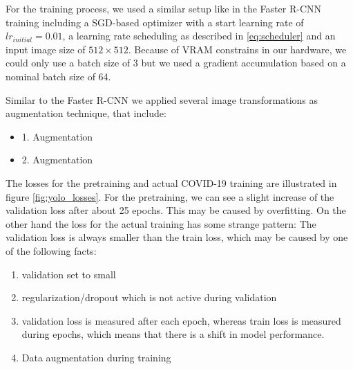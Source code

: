 For the training process, we used a similar setup like in the Faster \ac{R-CNN} training including a \ac{SGD}-based optimizer with a start learning rate of $lr_{initial} = 0.01$, a learning rate scheduling as described in \ref{eq:scheduler} and an input image size of $512 \times 512$. Because of VRAM constrains in our hardware, we could only use a batch size of 3 but we used a gradient accumulation based on a nominal batch size of 64.
 
Similar to the Faster \ac{R-CNN} we applied several image transformations as augmentation technique, that include:
\begin{itemize}
	\item 1. Augmentation
	\item 2. Augmentation
\end{itemize}

The losses for the pretraining and actual COVID-19 training are illustrated in figure \ref{fig:yolo_losses}. For the pretraining, we can see a slight increase of the validation loss after about 25 epochs. This may be caused by overfitting. On the other hand the loss for the actual training has some strange pattern: The validation loss is always smaller than the train loss, which may be caused by one of the following facts:
\begin{enumerate}
	\item validation set to small
	\item regularization/dropout which is not active during validation
	\item validation loss is measured after each epoch, whereas train loss is measured during epochs, which means that there is a shift in model performance.
	\item Data augmentation during training
\end{enumerate}

